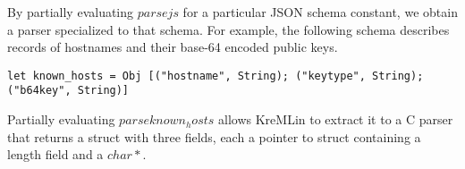 By partially evaluating \lst$parse js$ for a particular JSON schema
constant, we obtain a parser specialized to that schema. For example,
the following schema describes records of hostnames and their base-64
encoded public keys.

\begin{lstlisting}
let known_hosts = Obj [("hostname", String); ("keytype", String); ("b64key", String)]
\end{lstlisting}

Partially evaluating \lst$parse known_hosts$ allows KreMLin to extract
it to a C parser that returns a struct with three fields, each a
pointer to struct containing a length field and a \lst$char*$.

\fi








